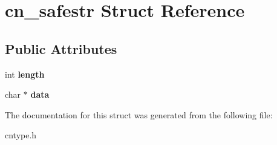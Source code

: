 \hypertarget{structcn__safestr}{\section{cn\-\_\-safestr Struct Reference}
\label{structcn__safestr}
}
\subsection*{Public Attributes}
\begin{DoxyCompactItemize}
\item 
\hypertarget{structcn__safestr_a5bbb85b209b0773e583feb3ea48335d2}{int {\bfseries length}}\label{structcn__safestr_a5bbb85b209b0773e583feb3ea48335d2}

\item 
\hypertarget{structcn__safestr_aea63d4bc249c4921c6b09439e7b7111b}{char $\ast$ {\bfseries data}}\label{structcn__safestr_aea63d4bc249c4921c6b09439e7b7111b}

\end{DoxyCompactItemize}


The documentation for this struct was generated from the following file\-:\begin{DoxyCompactItemize}
\item 
cntype.\-h\end{DoxyCompactItemize}
